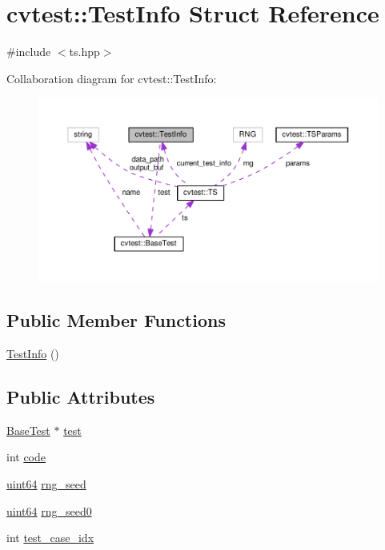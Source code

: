 \hypertarget{structcvtest_1_1TestInfo}{\section{cvtest\-:\-:Test\-Info Struct Reference}
\label{structcvtest_1_1TestInfo}
}


{\ttfamily \#include $<$ts.\-hpp$>$}



Collaboration diagram for cvtest\-:\-:Test\-Info\-:\nopagebreak
\begin{figure}[H]
\begin{center}
\leavevmode
\includegraphics[width=350pt]{structcvtest_1_1TestInfo__coll__graph}
\end{center}
\end{figure}
\subsection*{Public Member Functions}
\begin{DoxyCompactItemize}
\item 
\hyperlink{structcvtest_1_1TestInfo_a34f1eaeb6e3bda40c8c698e34d71f839}{Test\-Info} ()
\end{DoxyCompactItemize}
\subsection*{Public Attributes}
\begin{DoxyCompactItemize}
\item 
\hyperlink{classcvtest_1_1BaseTest}{Base\-Test} $\ast$ \hyperlink{structcvtest_1_1TestInfo_a8853c7f79dd9c744b3d71b5d74698c7b}{test}
\item 
int \hyperlink{structcvtest_1_1TestInfo_a4fc014e932686937f7fbea569f08f956}{code}
\item 
\hyperlink{core_2types__c_8h_abc0f5bc07737e498f287334775dff2b6}{uint64} \hyperlink{structcvtest_1_1TestInfo_a9ca8f703f0cae481c787fe421772dcb7}{rng\-\_\-seed}
\item 
\hyperlink{core_2types__c_8h_abc0f5bc07737e498f287334775dff2b6}{uint64} \hyperlink{structcvtest_1_1TestInfo_a767eb110885736eb548ec27b138d8664}{rng\-\_\-seed0}
\item 
int \hyperlink{structcvtest_1_1TestInfo_a30af82d049723a3f82baa28b0fd9c26b}{test\-\_\-case\-\_\-idx}
\end{DoxyCompactItemize}


